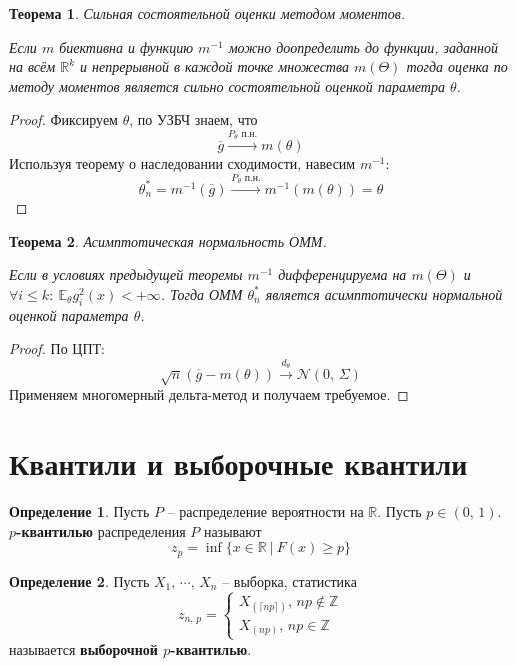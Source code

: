 \documentclass[a4paper,12pt]{article}
\renewcommand{\leq}{\ensuremath{\leqslant}}
\renewcommand{\geq}{\ensuremath{\geqslant}}
\theoremstyle{plain}
\newtheorem{theorem}{Теорема}[section]
\theoremstyle{definition}
\newtheorem{definition}{Определение}[section]
\theoremstyle{remark}
\begin{document}
\begin{theorem}
  Сильная состоятельной оценки методом моментов.

  Если $m$ биективна и функцию $m^{-1}$ можно доопределить до функции, заданной на всём $\mathbb{R}^k$ и непрерывной в каждой точке множества $m(\Theta)$ тогда оценка по методу моментов является сильно состоятельной оценкой параметра $\theta$.
\end{theorem}

\begin{proof}
  Фиксируем $\theta$, по УЗБЧ знаем, что
  \[
    \overline{g} \overset{P_\theta \text{ п.н.}}{\to} m(\theta)
  \]
  Используя теорему о наследовании сходимости, навесим $m^{-1}$:
  \[
    \theta_n^* = m^{-1}(\overline{g}) \overset{P_\theta \text{ п.н.}}{\to} m^{-1}(m(\theta)) = \theta
  \] 
\end{proof}

\begin{theorem}
  Асимптотическая нормальность ОММ.

  Если в условиях предыдущей теоремы $m^{-1}$ дифференцируема на $m(\Theta)$ и $\forall i \leq k :\: \mathbb{E}_\theta g_i^2(x) < +\infty$. Тогда ОММ $\theta_n^*$ является асимптотически нормальной оценкой параметра $\theta$.
\end{theorem}

\begin{proof}
  По ЦПТ:
  \[
    \sqrt{n}(\overline{g} - m(\theta)) \overset{d_\theta}{\to} \mathcal{N}(0,\, \Sigma)
  \]
  Применяем многомерный дельта-метод и получаем требуемое.
\end{proof}

\section{Квантили и выборочные квантили}
\begin{definition}
  Пусть $P$ -- распределение вероятности на $\mathbb{R}$. Пусть $p \in (0,\, 1)$. \textbf{$p$-квантилью} распределения $P$ называют 
  \[
    z_p = \inf\{x \in \mathbb{R} \:\vert\: F(x) \geq p\}
  \]
\end{definition}

\begin{definition}
  Пусть $X_1,\,\cdots,\,X_n$ -- выборка, статистика
  \[
    z_{n,\,p} = \begin{cases}
      X_{(\lceil np\rceil)},\, np \not\in \mathbb{Z}\\
      X_{(np)},\, np \in \mathbb{Z}
    \end{cases}
  \]
  называется \textbf{выборочной $p$-квантилью}.
\end{definition}
\end{document}

